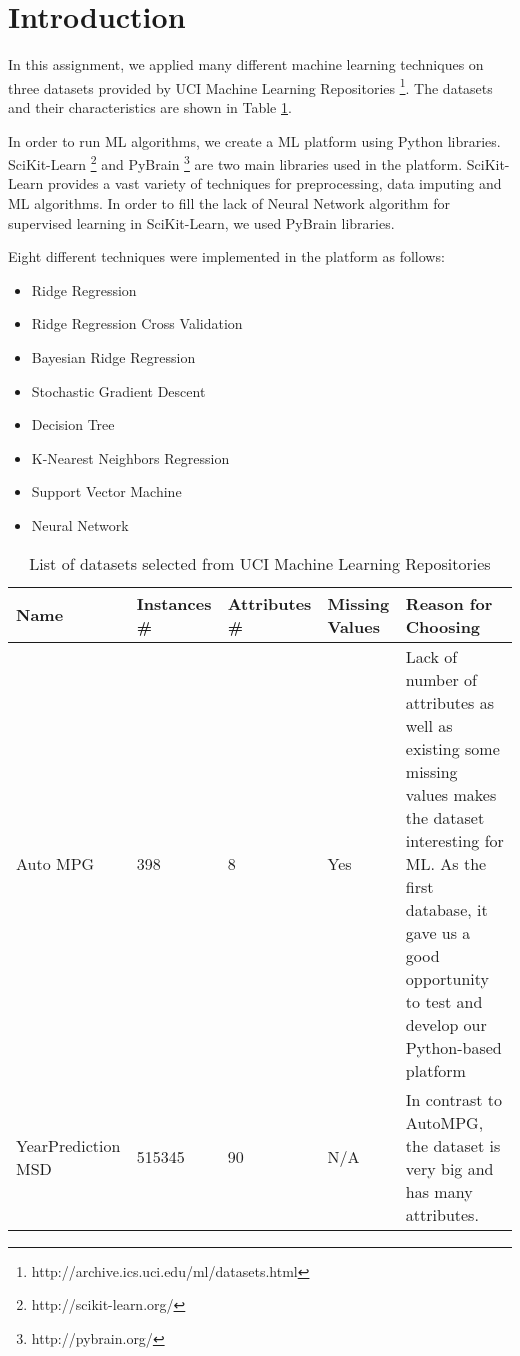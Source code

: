 \section{Introduction}
In this assignment, we applied many different machine learning techniques on three datasets provided by UCI Machine Learning Repositories \footnote{http://archive.ics.uci.edu/ml/datasets.html}. The datasets and their characteristics are shown in Table \ref{table:datasets}.

In order to run ML algorithms, we create a ML platform using Python libraries. SciKit-Learn \footnote{http://scikit-learn.org/} and PyBrain  \footnote{http://pybrain.org/} are two main libraries used in the platform. SciKit-Learn provides a vast variety of techniques for preprocessing, data imputing and ML algorithms. In order to fill the lack of Neural Network algorithm for supervised learning in SciKit-Learn, we used PyBrain libraries.

Eight different techniques were implemented in the platform as follows:
\begin{itemize}
  \item Ridge Regression
  \item Ridge Regression Cross Validation
  \item Bayesian Ridge Regression
  \item Stochastic Gradient Descent
  \item Decision Tree
  \item K-Nearest Neighbors Regression
  \item Support Vector Machine
  \item Neural Network  
\end{itemize}

\begin{center}
\begin{table}
    \begin{tabular}{ | p{2.5cm} | p{1cm} | p{1cm} | p{1cm} | p{7cm} |}
    \hline
    Name & Instances \# & Attributes \# & Missing Values & Reason for Choosing \\ \hline
    Auto MPG & 398 & 8 & Yes & Lack of number of attributes as well as existing some missing values makes the dataset interesting for ML. As the first database, it gave us a good opportunity to test and develop our Python-based platform\\ \hline
    YearPrediction MSD & 515345 & 90 & N/A & In contrast to AutoMPG, the dataset is very big and has many attributes.\\ \hline
    \end{tabular}
    \caption{List of datasets selected from UCI Machine Learning Repositories}
    \label{table:datasets}
    \end{table}
\end{center}
